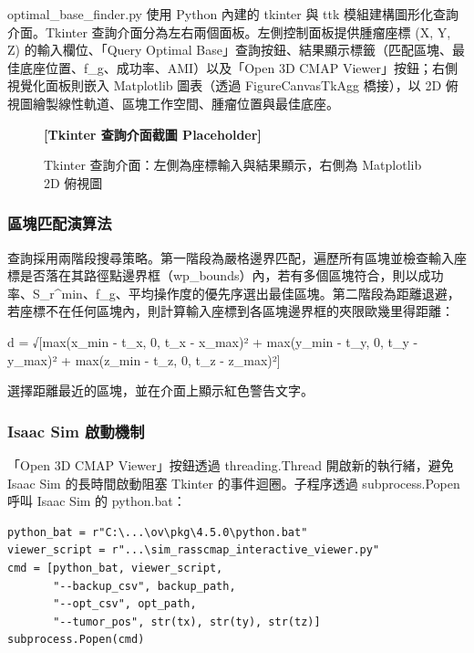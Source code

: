 \documentclass[a4paper, 12pt]{article}
\begin{document}
optimal\_base\_finder.py 使用 Python 內建的 tkinter 與 ttk 模組建構圖形化查詢介面。Tkinter 查詢介面分為左右兩個面板。左側控制面板提供腫瘤座標 (X, Y, Z) 的輸入欄位、「Query Optimal Base」查詢按鈕、結果顯示標籤（匹配區塊、最佳底座位置、f\_g、成功率、AMI）以及「Open 3D CMAP Viewer」按鈕；右側視覺化面板則嵌入 Matplotlib 圖表（透過 FigureCanvasTkAgg 橋接），以 2D 俯視圖繪製線性軌道、區塊工作空間、腫瘤位置與最佳底座。

\begin{figure}[H]
    \centering
    \textbf{[Tkinter 查詢介面截圖 Placeholder]}
    \caption{Tkinter 查詢介面：左側為座標輸入與結果顯示，右側為 Matplotlib 2D 俯視圖}
    \label{fig:tkinter_gui}
\end{figure}

\subsubsection{區塊匹配演算法}

查詢採用兩階段搜尋策略。第一階段為嚴格邊界匹配，遍歷所有區塊並檢查輸入座標是否落在其路徑點邊界框（wp\_bounds）內，若有多個區塊符合，則以成功率、S\_r\^{}min、f\_g、平均操作度的優先序選出最佳區塊。第二階段為距離退避，若座標不在任何區塊內，則計算輸入座標到各區塊邊界框的夾限歐幾里得距離：
\begin{center}
d = √[max(x\_min - t\_x, 0, t\_x - x\_max)² + max(y\_min - t\_y, 0, t\_y - y\_max)² + max(z\_min - t\_z, 0, t\_z - z\_max)²]
\end{center}
選擇距離最近的區塊，並在介面上顯示紅色警告文字。

\subsubsection{Isaac Sim 啟動機制}

「Open 3D CMAP Viewer」按鈕透過 threading.Thread 開啟新的執行緒，避免 Isaac Sim 的長時間啟動阻塞 Tkinter 的事件迴圈。子程序透過 subprocess.Popen 呼叫 Isaac Sim 的 python.bat：

\begin{lstlisting}[caption={Tkinter 啟動 Isaac Sim 的指令組裝},label={lst:launcher}]
python_bat = r"C:\...\ov\pkg\4.5.0\python.bat"
viewer_script = r"...\sim_rasscmap_interactive_viewer.py"
cmd = [python_bat, viewer_script,
       "--backup_csv", backup_path,
       "--opt_csv", opt_path,
       "--tumor_pos", str(tx), str(ty), str(tz)]
subprocess.Popen(cmd)
\end{lstlisting}
\end{document}
